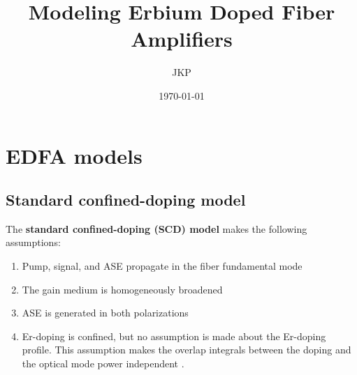 \documentclass[a4paper]{article}
\title{Modeling Erbium Doped Fiber Amplifiers}
\author{JKP}
\date{\today}
\begin{document}
\maketitle

\section{EDFA models}

\subsection{Standard confined-doping model}

The \textbf{standard confined-doping (SCD) model} makes the following assumptions:

\begin{enumerate}
	\item Pump, signal, and ASE propagate in the fiber fundamental mode 
	\item The gain medium is homogeneously broadened 
	\item ASE is generated in both polarizations
	\item Er-doping is confined, but no assumption is made about the Er-doping profile. This assumption makes the overlap integrals between the doping and the optical mode power independent \cite{Giles1991, edfa_device}.
\end{enumerate}
\end{document}
